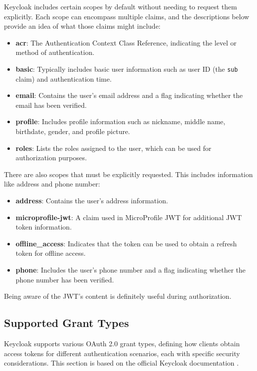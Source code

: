 Keycloak includes certain scopes by default without needing to request them explicitly. Each scope can encompass multiple claims, and the descriptions below provide an idea of what those claims might include:

\begin{itemize} 
    \item \textbf{acr}: The Authentication Context Class Reference, indicating the level or method of authentication. 
    \item \textbf{basic}: Typically includes basic user information such as user ID (the \texttt{sub} claim) and authentication time. 
    \item \textbf{email}: Contains the user's email address and a flag indicating whether the email has been verified. 
    \item 
    \textbf{profile}: Includes profile information such as nickname, middle name, birthdate, gender, and profile picture. 
    \item \textbf{roles}: Lists the roles assigned to the user, which can be used for authorization purposes. 
\end{itemize}

There are also scopes that must be explicitly requested. This includes information like address and phone number:

\begin{itemize} 
    \item \textbf{address}: Contains the user's address information. 
    \item \textbf{microprofile-jwt}: A claim used in MicroProfile JWT for additional JWT token information. 
    \item \textbf{offline\_access}: Indicates that the token can be used to obtain a refresh token for offline access. 
    \item \textbf{phone}: Includes the user's phone number and a flag indicating whether the phone number has been verified. 
\end{itemize}

Being aware of the JWT's content is definitely useful during authorization.

\subsection{Supported Grant Types}
Keycloak supports various OAuth 2.0 grant types, defining how clients obtain access tokens for different authentication scenarios, each with specific security considerations. This section is based on the official Keycloak documentation \Parencite{keycloakGrantTypes}.


